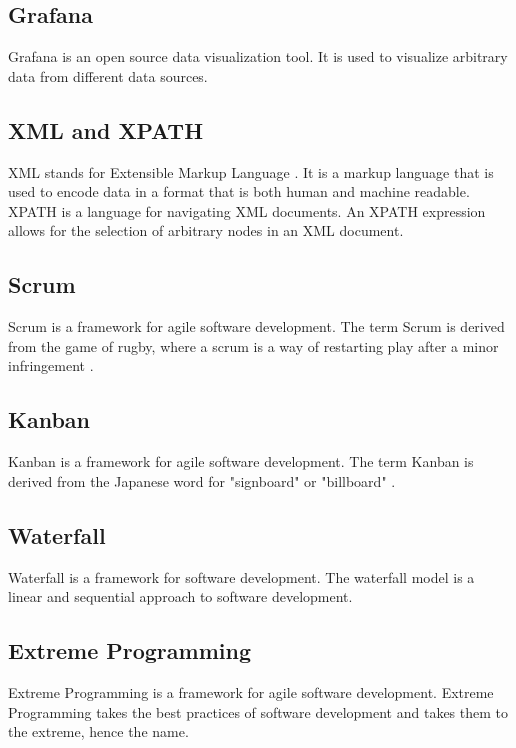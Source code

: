 \documentclass[12pt]{article}
\begin{document}
\subsection{Grafana}
Grafana \cite{GrafanaOpenComposable} is an open source data visualization tool.
It is used to visualize arbitrary data from different data sources.

\subsection{XML and XPATH}
XML stands for Extensible Markup Language \cite{ExtensibleMarkupLanguage}. It is a
markup language that is used to encode data in a format that is both human and machine readable.
XPATH \cite{XMLPathLanguage} is a language for navigating XML documents.
An XPATH expression allows for the selection of arbitrary nodes in an XML document.

\subsection{Scrum}
Scrum \cite{HomeScrumorg} is a framework for agile \cite{AgileSoftwareDevelopment2025} software development. 
The term Scrum is derived from the game of rugby, where a scrum is a way of restarting play after a minor infringement \cite{ScrumRugbyUnion2025}.

\subsection{Kanban}
Kanban \cite{Kanban2025} is a framework for agile software development.
The term Kanban is derived from the Japanese word for "signboard" or "billboard" \cite{KanbanDevelopment2025}.

\subsection{Waterfall}
Waterfall \cite{WaterfallModel2025} is a framework for software development.
The waterfall model is a linear and sequential approach to software development.

\subsection{Extreme Programming}
Extreme Programming \cite{ExtremeProgramming2025} is a framework for agile software development.
Extreme Programming takes the best practices of software development and takes them to the extreme, hence the name.
\end{document}
